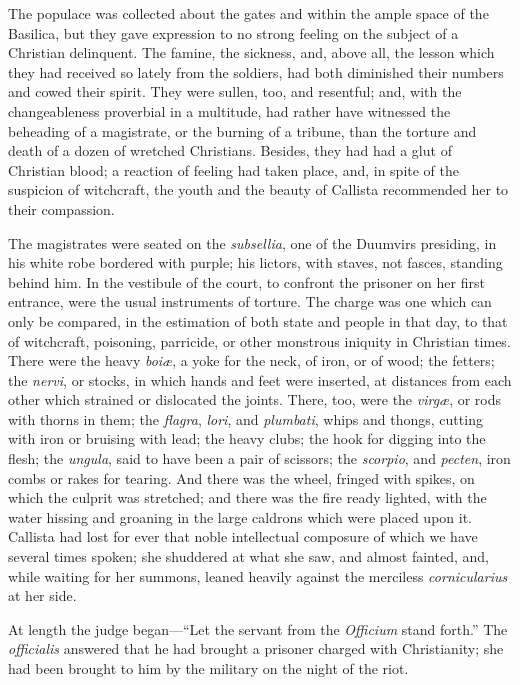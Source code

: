 The populace was collected about the gates and within the ample
space of the Basilica, but they gave expression to no strong feeling
on the subject of a Christian delinquent. The famine, the sickness,
and, above all, the lesson which they had received so lately from the
soldiers, had both diminished their numbers and cowed their spirit.
They were sullen, too, and resentful; and, with the changeableness
proverbial in a multitude, had rather have witnessed the beheading of
a magistrate, or the burning of a tribune, than the torture and death
of a dozen of wretched Christians. Besides, they had had a glut
of Christian blood; a reaction of feeling had taken place, and, in
spite of the suspicion of witchcraft, the youth and the beauty of
Callista recommended her to their compassion.

The magistrates were seated on the \emph{subsellia}, one of the
Duumvirs presiding, in his white robe bordered with purple; his
lictors, with staves, not fasces, standing behind him. In the
vestibule of the court, to confront the prisoner on her first
entrance, were the usual instruments of torture. The charge was one
which can only be compared, in the estimation of both state and people
in that day, to that of witchcraft, poisoning, parricide, or other
monstrous iniquity in Christian times. There were the heavy \emph{boiæ},
a yoke for the neck, of iron, or of wood; the fetters; the \emph{nervi},
or stocks, in which hands and feet were inserted, at distances from
each other which strained or dislocated the joints. There, too, were
the \emph{virgæ}, or rods with thorns in them; the \emph{flagra}, \emph{lori},
and \emph{plumbati}, whips and thongs, cutting with iron or bruising
with lead; the heavy clubs; the hook for digging into the flesh; the \emph{ungula},
said to have been a pair of scissors; the \emph{scorpio}, and \emph{pecten},
iron combs or rakes for tearing. And there was the wheel, fringed with
spikes, on which the culprit was stretched; and there was the fire
ready lighted, with the water hissing and groaning in the large
caldrons which were placed upon it. Callista had lost for ever that
noble intellectual composure of which we have several times spoken;
she shuddered at what she saw, and almost fainted, and, while waiting
for her summons, leaned heavily against the merciless \emph{cornicularius}
at her side.

At length the judge began—``Let the servant from the \emph{Officium}
stand forth.'' The \emph{officialis} answered that he had brought
a prisoner charged with Christianity; she had been brought to him by
the military on the night of the riot.

